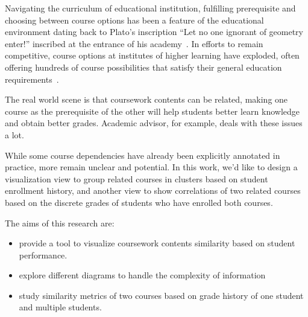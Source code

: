
Navigating the curriculum of educational institution, fulfilling prerequisite and choosing between course options has been a feature of the educational environment dating back to Plato’s inscription ``Let no one ignorant of geometry enter!'' inscribed at the entrance of his academy~\cite{anglin1994mathematics}. In efforts to remain competitive, course options at institutes of higher learning have exploded, often offering hundreds of course possibilities that satisfy their general education requirements~\cite{schwartz2009paradox}.

The real world scene is that coursework contents can be related, making one course as the prerequisite of the other will help students better learn knowledge and obtain better grades. Academic advisor, for example, deals with these issues a lot.

While some course dependencies have already been explicitly annotated in practice, more remain unclear and potential. In this work, we’d like to design a visualization view to group related courses in clusters based on student enrollment history, and another view to show correlations of two related courses based on the discrete grades of students who have enrolled both courses.

The aims of this research are:
\begin{itemize}
  \item provide a tool to visualize coursework contents similarity based on student performance.
  \item explore different diagrams to handle the complexity of information
  \item study similarity metrics of two courses based on grade history of one student and multiple students.
\end{itemize}

